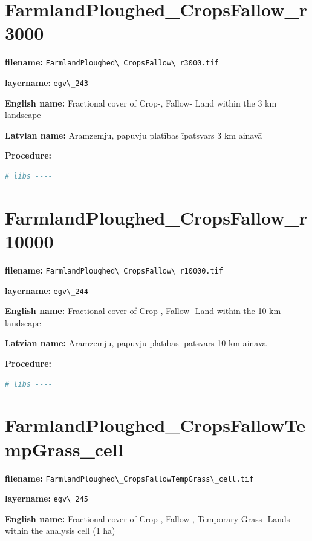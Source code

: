 \documentclass[
]{book}
\newcommand{\passthrough}[1]{#1}
\begin{document}
\section{FarmlandPloughed\_CropsFallow\_r3000}\label{ch06.243}

\textbf{filename:} \passthrough{\lstinline!FarmlandPloughed\_CropsFallow\_r3000.tif!}

\textbf{layername:} \passthrough{\lstinline!egv\_243!}

\textbf{English name:} Fractional cover of Crop-, Fallow- Land within the 3 km landscape

\textbf{Latvian name:} Aramzemju, papuvju platības īpatsvars 3 km ainavā

\textbf{Procedure:}

\begin{lstlisting}[language=R]
# libs ----
\end{lstlisting}

\section{FarmlandPloughed\_CropsFallow\_r10000}\label{ch06.244}

\textbf{filename:} \passthrough{\lstinline!FarmlandPloughed\_CropsFallow\_r10000.tif!}

\textbf{layername:} \passthrough{\lstinline!egv\_244!}

\textbf{English name:} Fractional cover of Crop-, Fallow- Land within the 10 km landscape

\textbf{Latvian name:} Aramzemju, papuvju platības īpatsvars 10 km ainavā

\textbf{Procedure:}

\begin{lstlisting}[language=R]
# libs ----
\end{lstlisting}

\section{FarmlandPloughed\_CropsFallowTempGrass\_cell}\label{ch06.245}

\textbf{filename:} \passthrough{\lstinline!FarmlandPloughed\_CropsFallowTempGrass\_cell.tif!}

\textbf{layername:} \passthrough{\lstinline!egv\_245!}

\textbf{English name:} Fractional cover of Crop-, Fallow-, Temporary Grass- Lands within the analysis cell (1 ha)
\end{document}
